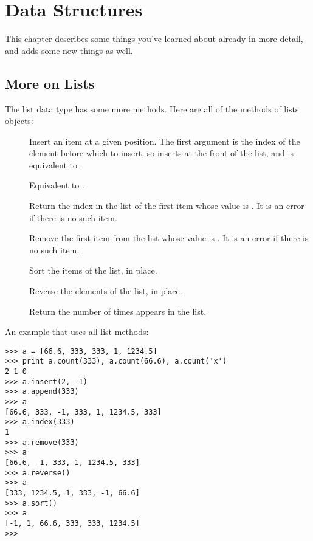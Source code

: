 \chapter{Data Structures}

This chapter describes some things you've learned about already in
more detail, and adds some new things as well.

\section{More on Lists}

The list data type has some more methods.  Here are all of the methods
of lists objects:

\begin{description}

\item[]
Insert an item at a given position.  The first argument is the index of
the element before which to insert, so  inserts at
the front of the list, and  is equivalent to
.

\item[]
Equivalent to .

\item[]
Return the index in the list of the first item whose value is .
It is an error if there is no such item.

\item[]
Remove the first item from the list whose value is .
It is an error if there is no such item.

\item[]
Sort the items of the list, in place.

\item[]
Reverse the elements of the list, in place.

\item[]
Return the number of times  appears in the list.

\end{description}

An example that uses all list methods:

\bcode\begin{verbatim}
>>> a = [66.6, 333, 333, 1, 1234.5]
>>> print a.count(333), a.count(66.6), a.count('x')
2 1 0
>>> a.insert(2, -1)
>>> a.append(333)
>>> a
[66.6, 333, -1, 333, 1, 1234.5, 333]
>>> a.index(333)
1
>>> a.remove(333)
>>> a
[66.6, -1, 333, 1, 1234.5, 333]
>>> a.reverse()
>>> a
[333, 1234.5, 1, 333, -1, 66.6]
>>> a.sort()
>>> a
[-1, 1, 66.6, 333, 333, 1234.5]
>>>
\end{verbatim}\ecode

